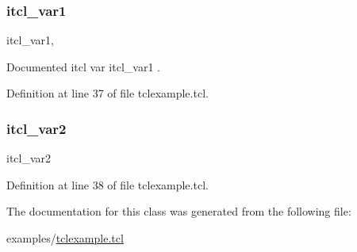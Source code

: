 \subsubsection{\texorpdfstring{itcl\+\_\+var1}{itcl\_var1}}
{\footnotesize\ttfamily itcl\+\_\+var1\hspace{0.3cm}{\ttfamily [static]}, {\ttfamily [protected]}}



Documented itcl var {\ttfamily itcl\+\_\+var1} . 



Definition at line 37 of file tclexample.\+tcl.

\mbox{\label{classns_1_1itcl__class_abef47039b3eb290a7ee36c12a800fd6e}} 
\subsubsection{\texorpdfstring{itcl\+\_\+var2}{itcl\_var2}}
{\footnotesize\ttfamily itcl\+\_\+var2\hspace{0.3cm}{\ttfamily [static]}}



Definition at line 38 of file tclexample.\+tcl.



The documentation for this class was generated from the following file\+:\begin{DoxyCompactItemize}
\item 
examples/\hyperlink{tclexample_8tcl}{tclexample.\+tcl}\end{DoxyCompactItemize}
